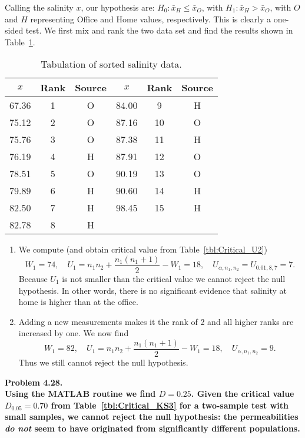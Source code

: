 Calling the salinity $x$, our hypothesis are: $H_0: \bar{x}_H \leq \bar{x}_O$, with $H_1: \bar{x}_H > \bar{x}_O$,
with $O$ and $H$ representing Office and Home values, respectively.
This is clearly a one-sided test.  We first mix and rank the two data set and find the results shown in Table~\ref{tbl:salts}.
\begin{table}[H]
\centering
\begin{tabular}{|c|c|c||c|c|c|} \hline
$x$ & \bf{Rank} & \bf{Source} & $x$ & \bf{Rank} & \bf{Source} \\ \hline
67.36 & 1 & O & 84.00 & 9  & H \\ \hline
75.12 & 2 & O & 87.16 & 10 & O \\ \hline
75.76 & 3 & O & 87.38 & 11 & H \\ \hline
76.19 & 4 & H & 87.91 & 12 & O \\ \hline
78.51 & 5 & O & 90.19 & 13 & O \\ \hline
79.89 & 6 & H & 90.60 & 14 & H \\ \hline
82.50 & 7 & H & 98.45 & 15 & H \\ \hline
82.78 & 8 & H &       &    &   \\ \hline
\end{tabular}
\caption{Tabulation of sorted salinity data.}
\label{tbl:salts}
\end{table}
\begin{enumerate}[label=\alph*)]
\item We compute (and obtain critical value from Table~\ref{tbl:Critical_U2})
$$
W_1 = 74, \quad U_1 = n_1n_2 + \frac{n_1(n_1+1)}{2} -W_1 = 18, \quad U_{\alpha,n_1,n_2} = U_{0.01,8,7} = 7.
$$
Because $U_1$ is not smaller than the critical value we cannot reject the null hypothesis.  In other words,
there is no significant evidence that salinity at home is higher than at the office.
\item Adding a new measurements makes it the rank of 2 and all higher ranks are increased by one.  We now find
$$
W_1 = 82, \quad U_1 = n_1n_2 + \frac{n_1(n_1+1)}{2} -W_1 = 18, \quad U_{\alpha,n_1,n_2} = 9.
$$
Thus we still cannot reject the null hypothesis.
\end{enumerate}


\noindent
\bf{Problem 4.28.} \\

Using the MATLAB routine we find $D = 0.25$.  Given the critical value $D_{0.05} = 0.70$ from Table~\ref{tbl:Critical_KS3} for
a two-sample test with small samples,
we cannot reject the null hypothesis: the permeabilities \emph{do not} seem to have originated from significantly
different populations.

